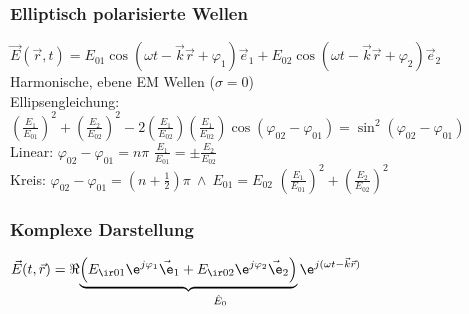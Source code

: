 \documentclass[german, fourcolumn, 6pt]{latex4ei/latex4ei_sheet}
\begin{document}
    \subsubsection{Elliptisch polarisierte Wellen}
$\vec E(\vec r,t) = E_{01} \cos(\omega t -\vec k\vec r + \varphi_1) \vec e_1 + E_{02} \cos(\omega t - \vec k\vec r + \varphi_2) \vec e_2$\\
    Harmonische, ebene EM Wellen ($\sigma = 0$)\\

    Ellipsengleichung:\\
$\left(\frac{E_1}{E_{01}}\right)^2 + \left(\frac{E_2}{E_{02}}\right)^2 - 2\left(\frac{E_1}{E_{02}}\right)\left(\frac{E_1}{E_{02}}\right) \cos(\varphi_{02} - \varphi_{01}) = \sin^2(\varphi_{02} - \varphi_{01})$\\
    Linear: $\varphi_{02} - \varphi_{01} = n\pi$ \qquad $\frac{E_1}{E_{01}} = \pm \frac{E_2}{E_{02}}$\\
    Kreis: $\varphi_{02} - \varphi_{01} = (n+\frac{1}{2}) \pi \ \land \ E_{01} = E_{02}$ \qquad $\left(\frac{E_1}{E_{01}}\right)^2 + \left(\frac{E_2}{E_{02}}\right)^2$\\

    \subsubsection{Komplexe Darstellung}
$\vec E(t,\vec r) = \Re{\underset{\hat E_0}{\underbrace{\left(E_{\ir 01}\e^{j\varphi_1}\vec\e_1 + E_{\ir 02}\e^{j\varphi_2}\vec\e_2\right)}\e^{j(\omega t-\vec k\vec r)}}}$\\
\end{document}
